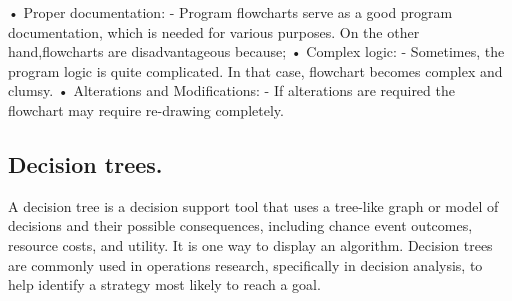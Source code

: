 \documentclass[11pt]{article}
\begin{document}
•	Proper documentation: - Program flowcharts serve as a good program documentation, which is needed for various purposes.
On the other hand,flowcharts are disadvantageous because;
•	Complex logic: - Sometimes, the program logic is quite complicated. In that case, flowchart becomes complex and clumsy.
•	Alterations and Modifications: - If alterations are required the flowchart may require re-drawing completely.

\subsection*{Decision trees.} 
A decision tree is a decision support tool that uses a tree-like graph or model of decisions and their possible consequences, including chance event outcomes, resource costs, and utility. It is one way to display an algorithm.
Decision trees are commonly used in operations research, specifically in decision analysis, to help identify a strategy most likely to reach a goal.
\end{document}
